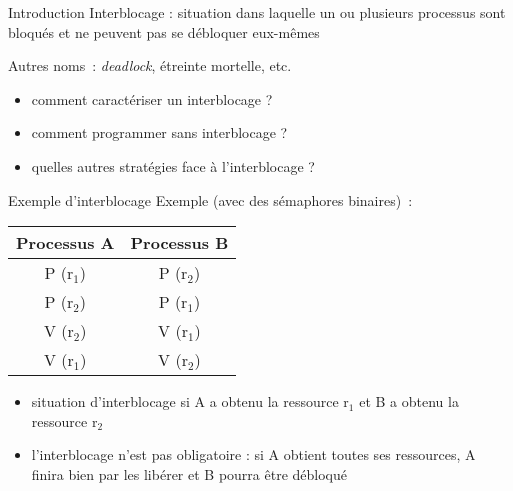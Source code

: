 %
%

\def\inc{inc5-interb}




\begin {frame} {Introduction}
    Interblocage : situation dans laquelle un ou plusieurs processus
    sont bloqués et ne peuvent pas se débloquer eux-mêmes

    \vspace* {3mm}

    Autres noms~: \emph {deadlock}, étreinte mortelle, etc.

    \vspace* {3mm}

    \begin {itemize}
	\item comment caractériser un interblocage ?
	\item comment programmer sans interblocage ?
	\item quelles autres stratégies face à l'interblocage ?
    \end {itemize}

\end {frame}

\begin {frame} {Exemple d'interblocage}
    Exemple (avec des sémaphores binaires)~:

    \begin {center}
	\footnotesize
	\begin {tabular} {c|c}
	    Processus A & Processus B \\
	    \hline
	    P (r$_1$) & P (r$_2$) \\
	    P (r$_2$) & P (r$_1$) \\
	    V (r$_2$) & V (r$_1$) \\
	    V (r$_1$) & V (r$_2$) \\
	\end {tabular}
    \end {center}

    \begin {itemize}
	\item situation d'interblocage si A a obtenu la ressource r$_1$ et
	    B a obtenu la ressource r$_2$

	\item l'interblocage n'est pas obligatoire : si A obtient toutes
	    ses ressources, A finira bien par les libérer et B pourra être
	    débloqué
    \end {itemize}

\end {frame}

